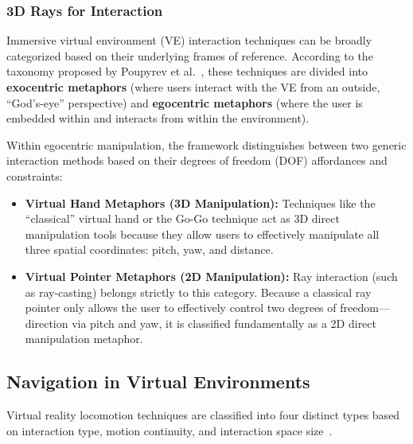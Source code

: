 \documentclass[inscr,ack,preface]{dithesis}
\begin{document}
\subsubsection{3D Rays for Interaction}

Immersive virtual environment (VE) interaction techniques can be broadly categorized based on their underlying frames of reference.
According to the taxonomy proposed by Poupyrev et al.~\cite{poupyrev1998egocentric}, these techniques are divided into
\textbf{exocentric metaphors}
(where users interact with the VE from an outside, ``God's-eye'' perspective) and \textbf{egocentric metaphors}
(where the user is embedded within and interacts from within the environment).

Within egocentric manipulation, the framework distinguishes between two generic interaction methods based on their degrees of freedom (DOF)
affordances and constraints:
\begin{itemize}
  \item \textbf{Virtual Hand Metaphors (3D Manipulation):} Techniques like the ``classical'' virtual hand or the Go-Go technique
        act as 3D direct manipulation tools because they allow users to effectively manipulate all three spatial coordinates: pitch, yaw, and
        distance.
  \item \textbf{Virtual Pointer Metaphors (2D Manipulation):} Ray interaction (such as ray-casting) belongs strictly to this category.
        Because a classical ray pointer only allows the user to effectively control two degrees of freedom—direction via
        pitch and yaw, it is classified fundamentally as a 2D direct manipulation metaphor.
\end{itemize}

\subsection{Navigation in Virtual Environments}
Virtual reality locomotion techniques are classified into four distinct types based on interaction type,
motion continuity, and interaction space size~\cite{mti1040024}.
\end{document}
